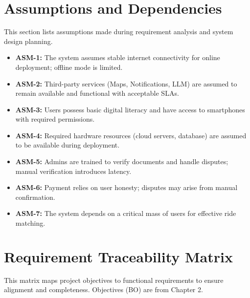 \section{Assumptions and Dependencies}

This section lists assumptions made during requirement analysis and system design planning.

\begin{itemize}
\item \textbf{ASM-1:} The system assumes stable internet connectivity for online deployment; offline mode is limited.
\item \textbf{ASM-2:} Third-party services (Maps, Notifications, LLM) are assumed to remain available and functional with acceptable SLAs.
\item \textbf{ASM-3:} Users possess basic digital literacy and have access to smartphones with required permissions.
\item \textbf{ASM-4:} Required hardware resources (cloud servers, database) are assumed to be available during deployment.
\item \textbf{ASM-5:} Admins are trained to verify documents and handle disputes; manual verification introduces latency.
\item \textbf{ASM-6:} Payment relies on user honesty; disputes may arise from manual confirmation.
\item \textbf{ASM-7:} The system depends on a critical mass of users for effective ride matching.
\end{itemize}

\section{Requirement Traceability Matrix}

This matrix maps project objectives to functional requirements to ensure alignment and completeness. Objectives (BO) are from Chapter 2.


